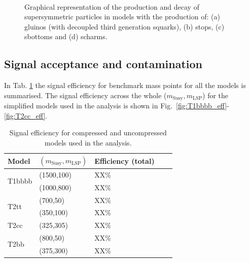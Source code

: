 \begin{figure}[h!]
\begin{center}
{            \label{fig:T2cc_feyn}
            } ~~
        \caption{Graphical representation of the production and decay of
            supersymmetric particles in models with the production of: (a)
            gluinos (with decoupled third generation squarks), (b) stops, (c)
            sbottoms and (d) scharms.}
        \label{fig:simplified-models-feyn}
    \end{center}
\end{figure}

\subsection{Signal acceptance and contamination}
\label{sec:sig-accept-contam}
In Tab. \ref{tab:sig-eff} the signal efficiency for benchmark mass points for
all the models is summarised. The signal efficiency across the whole
($m_{\mathrm{Susy}},m_{\mathrm{LSP}}$) for the simplified models used in the
analysis is shown in Fig.~\ref{fig:T1bbbb_eff}-\ref{fig:T2cc_eff}.

\begin{table}[h!]
    \caption{Signal efficiency for compressed and uncompressed models used in
        the analysis.}
    \label{tab:sig-eff}
    \centering
    \begin{tabular}{ lllll }
        \hline \hline
        Model & $(m_{\mathrm{Susy}},m_{\mathrm{LSP}})$ & Efficiency (total) \\ 
        \hline
        \multirow{2}{*}{T1bbbb}
            & (1500,100) & XX\% \\
            & (1000,800) & XX\% \\
        \hline
        \multirow{2}{*}{T2tt}
            & (700,50)  & XX\% \\
            & (350,100) & XX\% \\
        \hline
        T2cc
            & (325,305) & XX\% \\
        \hline
        \multirow{2}{*}{T2bb}
            & (800,50)  & XX\% \\
            & (375,300) & XX\% \\
        \hline \hline
    \end{tabular}
\end{table}

